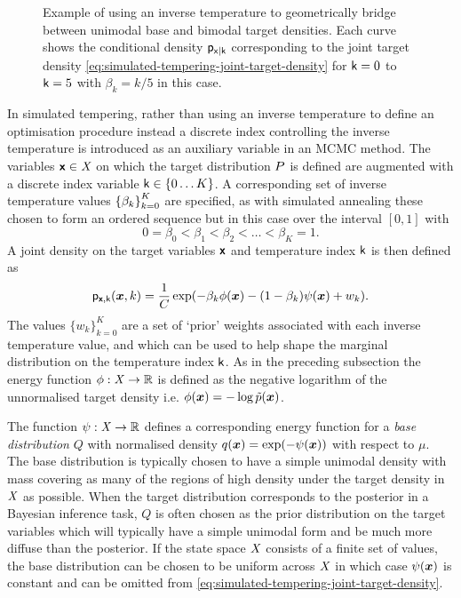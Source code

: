 \begin{figure}[t]
\centering
{}
\caption[Geometric density bridge example.]{Example of using an inverse temperature to geometrically bridge between unimodal base and bimodal target densities. Each curve shows the conditional density $\mathsf{p}_{\mathsf{x}|\mathsf{k}}$ corresponding to the joint target density \eqref{eq:simulated-tempering-joint-target-density} for $\mathsf{k}=0$ to $\mathsf{k}=5$ with $\beta_k = k / 5$ in this case.}
\label{fig:geometric-bridge-example}
\end{figure}

In simulated tempering, rather than using an inverse temperature to define an optimisation procedure instead a discrete index controlling the inverse temperature is introduced as an auxiliary variable in an \ac{MCMC} method. The variables $\boldsymbol{\mathsf{x}} \in \mathit{X}$ on which the target distribution $P$ is defined are augmented with a discrete index variable $\rvar{k} \in \fset{0 \dots K}$.  A corresponding set of inverse temperature values $\fset{\beta_k}_{k=0}^K$ are specified, as with simulated annealing these chosen to form an ordered sequence but in this case over the interval $[0,1]$ with 
\begin{equation}
0 = \beta_0 < \beta_1 < \beta_2 < \dots < \beta_K =1.
\end{equation} 
A joint density on the target variables $\boldsymbol{\mathsf{x}}$ and temperature index $\mathsf{k}$ is then defined as
\begin{equation}\label{eq:simulated-tempering-joint-target-density}
  \pden{\rvct{x},\rvar{k}}(\vct{x},k) = \frac{1}{C}
  \exp\lpa - \beta_k \phi(\vct{x}) - (1 - \beta_k) \psi(\vct{x}) + w_k\rpa.
\end{equation}
The values $\lbrace w_k \rbrace_{k=0}^K$ are a set of `prior' weights associated with each inverse temperature value, and which can be used to help shape the marginal distribution on the temperature index $\mathsf{k}$. As in the preceding subsection the energy function $\phi : \mathit{X} \to \mathbb{R}$ is defined as the negative logarithm of the unnormalised target density i.e. $\phi(\boldsymbol{x}) = -\log \tilde{p}(\boldsymbol{x})$. 

The function $\psi : \mathit{X} \to \mathbb{R}$ defines a corresponding energy function for a \emph{base distribution} $Q$ with {normalised} density $q(\vct{x}) = \exp\lpa-\psi(\vct{x})\rpa$ with respect to $\mu$. The base distribution is typically chosen to have a simple unimodal density with mass covering as many of the regions of high density under the target density in $\mathit{X}$ as possible. When the target distribution corresponds to the posterior in a Bayesian inference task, $Q$ is often chosen as the prior distribution on the target variables which will typically have a simple unimodal form and be much more diffuse than the posterior. If the state space $\mathit{X}$ consists of a finite set of values, the base distribution can be chosen to be uniform across $\mathit{X}$ in which case $\psi(\boldsymbol{x})$ is constant and can be omitted from \eqref{eq:simulated-tempering-joint-target-density}.

